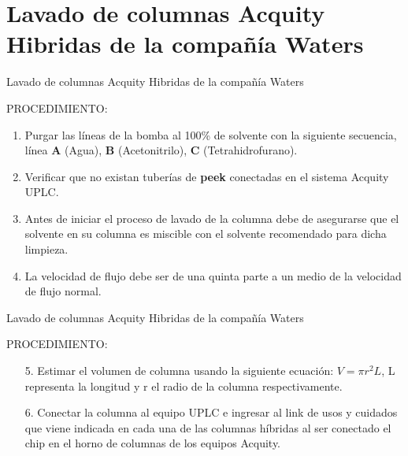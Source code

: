 \documentclass[11pt]{beamer}
\begin{document}
    \section{Lavado de columnas Acquity Hibridas de la compañía  Waters }
      \begin{frame}{Lavado de columnas Acquity Hibridas de la compañía  Waters}
        \begin{block}{PROCEDIMIENTO:}
            \begin{enumerate}
                \item Purgar las líneas de la bomba al 100\% de solvente con la siguiente secuencia, línea \textbf{ A} (Agua), \textbf{B} (Acetonitrilo), \textbf{C} (Tetrahidrofurano).
                \item Verificar que no existan tuberías de \textbf{peek} conectadas en el sistema Acquity UPLC.
                \item Antes de iniciar el proceso de lavado de la columna debe de asegurarse que el solvente en su columna es miscible con el solvente recomendado para dicha limpieza.
                \item La velocidad de flujo debe ser de una quinta parte a un medio de la velocidad de flujo normal.

            \end{enumerate}
        \end{block}
      \end{frame}
      \begin{frame}{Lavado de columnas Acquity Hibridas de la compañía  Waters}
          \begin{block}{PROCEDIMIENTO:}
              \begin{enumerate}
                  \item[5.] Estimar el volumen de columna usando la siguiente ecuación: $V=\pi r^2 L$, L representa la longitud y r el radio de la columna respectivamente.
                  \item[6.] Conectar la columna al equipo UPLC e ingresar al link de usos y cuidados que viene indicada en cada una de las columnas híbridas al ser conectado el chip en el horno de columnas de los equipos Acquity.
              \end{enumerate}
          \end{block}
      \end{frame}
\end{document}
